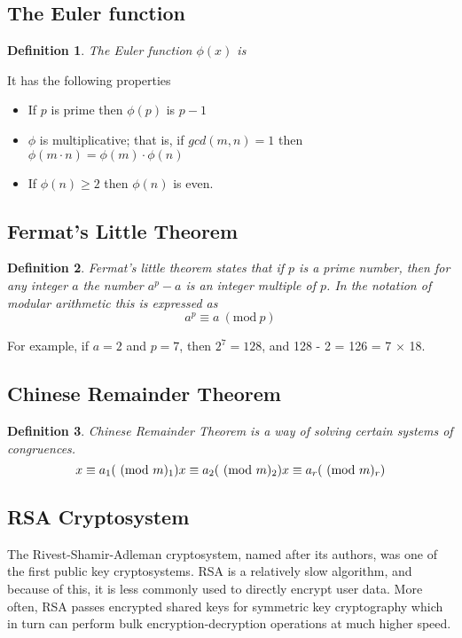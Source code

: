 \documentclass{article}
\theoremstyle{quest}
\newtheorem*{definition}{Definition}
\newcommand{\Mod}[1]{\ (\mathrm{mod}\ #1)}
\begin{document}
\subsection{The Euler function}
\begin{definition}
    The \textit{Euler function} $\phi(x)$ is
\end{definition}
It has the following properties
\begin{itemize}
    \item If $p$ is prime then $\phi(p)$ is $p - 1$
    \item $\phi$ is multiplicative; that is,
        if $gcd(m,n) = 1$ then $\phi(m \cdot n) = \phi(m) \cdot \phi(n)$
    \item If $\phi(n) \geq 2$ then $\phi(n)$ is even.
\end{itemize}

\subsection{Fermat's Little Theorem}
\begin{definition}
    \textit{Fermat's little theorem} states that if $p$ is a prime number,
    then for any integer $a$ the number $a^p - a$ is an integer multiple of $p$.
    In the notation of modular arithmetic this is expressed as
    $$ a^p \equiv a \Mod p $$
\end{definition}
For example, if $a = 2$ and $p = 7$, then $2^7 = 128$, and 128 - 2 = 126 = 7 $\times$ 18.

\subsection{Chinese Remainder Theorem}
\begin{definition}
    \textit{Chinese Remainder Theorem} is a way of solving certain systems of congruences.
    $$
    x \equiv a_1 (\Mod m_1) \\
    x \equiv a_2 (\Mod m_2) \\
    x \equiv a_r (\Mod m_r)
    $$
\end{definition}

\subsection{RSA Cryptosystem}
The Rivest-Shamir-Adleman cryptosystem,
named after its authors, was one of the first public key cryptosystems.
RSA is a relatively slow algorithm, and because of this,
it is less commonly used to directly encrypt user data.
More often, RSA passes encrypted shared keys for symmetric key cryptography
which in turn can perform bulk encryption-decryption operations at much higher speed.
\end{document}
